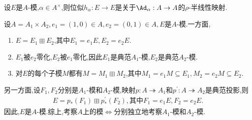 \begin{example}{}{}
	设$E$是$A$-模,$\alpha\in A^{\times}$,则位似$h_{\alpha}:E\to E$是关于$\Ad_{\alpha}:A\to A$的$\rho$-半线性映射.
\end{example}

\begin{remark}{}{}
	设$A=A_{1}\times A_{2},e_{1}=\left(1,0\right)\in A,e_{2}=\left(0,1\right)\in A,E$是$A$-模.一方面,
	\begin{enumerate}
		\item $E=E_{1}\boxplus E_{2}$,其中$E_{1}=e_{1}E,E_{2}=e_{2}E$.
		\item $E_{1}$被$e_{2}$零化,$E_{2}$被$e_{1}$零化,因此$E_{1}$是典范$A_{1}$-模,$E_{2}$是典范$A_{2}$-模.
		\item 对$E$的每个子模$M$都有$M=M_{1}\boxplus M_{2}$,其中$M_{1}=e_{1}M\subseteq E_{1},M_{2}=e_{2}M\subseteq E_{2}$.
	\end{enumerate}
	另一方面,设$F_{1},F_{2}$分别是$A_{1}$-模和$A_{2}$-模,映射$p:A\twoheadrightarrow A_{1}$和$p^{\prime}:A\twoheadrightarrow A_{2}$是典范投影,则
	\begin{align*}
		E=p_{\ast}\left(F_{1}\right)\boxplus p_{\ast}^{\prime}\left(F_{2}\right),\text{其中}F_{1}=e_{1}E,F_{2}=e_{2}E.
	\end{align*}
	因此,$E$是$A$-模.综上,考察$A$上的模$\iff$分别独立地考察$A_{1}$-模和$A_{2}$-模.
\end{remark}











